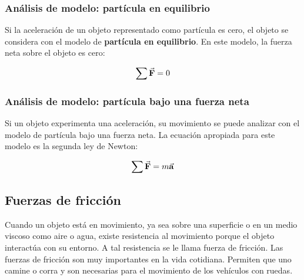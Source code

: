     \subsubsection{Análisis de modelo: partícula en equilibrio}
      \PN Si la aceleración de un objeto representado como partícula es cero, el objeto se considera con el modelo de
      \textbf{partícula en equilibrio}. En este modelo, la fuerza neta sobre el objeto es cero:

      \[
        \sum \vec{\mathbf{F}} = 0
      \]

    \subsubsection{Análisis de modelo: partícula bajo una fuerza neta}
      \PN Si un objeto experimenta una aceleración, su movimiento se puede analizar con el modelo de partícula bajo una
      fuerza neta. La ecuación apropiada para este modelo es la segunda ley de Newton:

      \[
        \sum \vec{\mathbf{F}} = m \vec{\mathbf{a}}
      \]

  \subsection{Fuerzas de fricción}
    \PN Cuando un objeto está en movimiento, ya sea sobre una superficie o en un medio viscoso como aire o agua, existe
    resistencia al movimiento porque el objeto interactúa con su entorno. A tal resistencia se le llama fuerza de
    fricción. Las fuerzas de fricción son muy importantes en la vida cotidiana. Permiten que uno camine o corra y son
    necesarias para el movimiento de los vehículos con ruedas.

